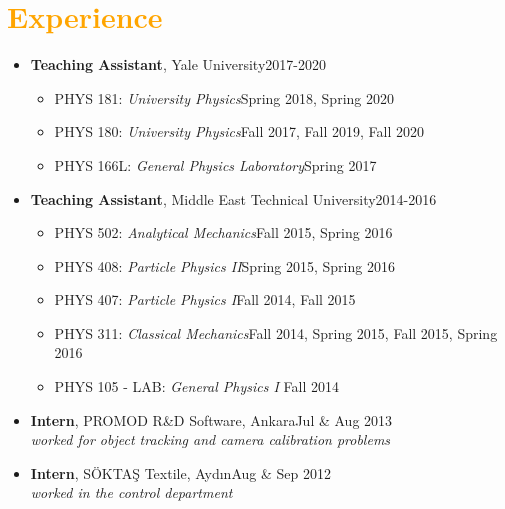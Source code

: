 \documentclass[letterpaper,11pt]{article}
\begin{document}
\section{\textcolor{Orange}{Experience}}
\begin{itemize}[noitemsep,nolistsep] 
	\item[] \textbf{Teaching Assistant}, Yale University\hfill 2017-2020
	\vspace*{-.3em}
	\begin{itemize}
		\item[] PHYS 181: \emph{University Physics}\hfill Spring 2018, Spring 2020\hspace*{2.2em}\vspace*{-.3em}
		\item[] PHYS 180: \emph{University Physics}\hfill Fall 2017, Fall 2019, Fall 2020\hspace*{2.2em}\vspace*{-.3em}
		\item[] PHYS 166L: \emph{General Physics Laboratory}\hfill Spring 2017\hspace*{2.2em}\vspace*{-.3em}
	\end{itemize} 
	\item[] \textbf{Teaching Assistant}, Middle East Technical University\hfill 2014-2016
	\vspace*{-.3em}
	\begin{itemize}
	\item[] PHYS 502: \emph{Analytical Mechanics}\hfill Fall 2015, Spring 2016\hspace*{2.2em}\vspace*{-.3em}
	\item[] PHYS 408: \emph{Particle Physics II}\hfill Spring 2015, Spring 2016\hspace*{2.2em}\vspace*{-.3em}
	\item[] PHYS 407: \emph{Particle Physics I}\hfill Fall 2014, Fall 2015\hspace*{2.2em}\vspace*{-.3em}
	\item[] PHYS 311: \emph{Classical Mechanics}\hfill Fall 2014, Spring 2015, Fall 2015, Spring 2016\hspace*{2.2em}\vspace*{-.3em}
	\item[] PHYS 105 - LAB: \emph{General Physics I} \hfill Fall 2014\hspace*{2.2em}\vspace*{-.3em}
	\end{itemize} 
	\item[] \textbf{Intern}, PROMOD R\&D Software, Ankara\hfill Jul \& Aug 2013\\	\hspace*{1.8em}\emph{worked for object tracking and camera calibration problems}
\vspace*{-.3em}
	\item[] \textbf{Intern}, SÖKTAŞ Textile, Aydın\hfill Aug \& Sep 2012\\	\hspace*{1.8em}\emph{worked in the control department}
\end{itemize}
\end{document}
